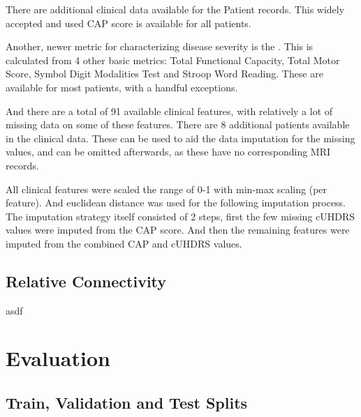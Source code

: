 There are additional clinical data available for the Patient records.  This widely accepted and used \ac{CAP} score is available for all patients.\par
Another, newer metric for characterizing disease severity is the . This is calculated from 4 other basic metrics: Total Functional Capacity, Total Motor Score, Symbol Digit Modalities Test and Stroop Word Reading. These are available for most patients, with a handful exceptions.\par
And there are a total of 91 available clinical features, with relatively a lot of missing data on some of these features. There are 8 additional patients available in the clinical data. These can be used to aid the data imputation for the missing values, and can be omitted afterwards, as these have no corresponding \ac{MRI} records.\par
All clinical features were scaled the range of 0-1 with min-max scaling (per feature). And euclidean distance was used for the following imputation process. The imputation strategy itself consisted of 2 steps, first the few missing \ac{cUHDRS} values were imputed from the \ac{CAP} score. And then the remaining features were imputed from the combined \ac{CAP} and \ac{cUHDRS} values.

\subsection{Relative Connectivity}

asdf

\section{Evaluation}

\subsection{Train, Validation and Test Splits}
\label{sec:travaltes}

